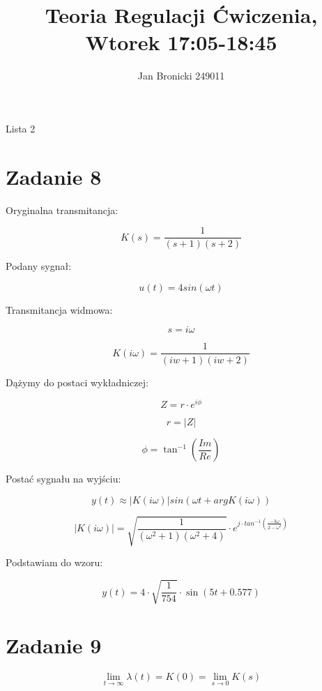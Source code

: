 \documentclass{article}
\title{Teoria Regulacji Ćwiczenia, Wtorek 17:05-18:45}
\author{Jan Bronicki 249011 }
\date{}
\begin{document}
\maketitle


\begin{center}
    Lista 2
\end{center}

\section*{Zadanie 8}

Oryginalna transmitancja:

$$ K(s) = \frac{1}{\left(s + 1\right) \left(s + 2\right)} $$

Podany sygnał:

$$ u(t) = 4sin(\omega t) $$

Transmitancja widmowa:

$$ s = i\omega $$

$$K(i\omega) = \frac{1}{\left(i w + 1\right) \left(i w + 2\right)}$$

Dążymy do postaci wykładniczej:

$$ Z=r\cdot e^{i\phi} $$

$$ r = |Z| $$

$$ \phi = \tan^{-1}\left(\frac{Im}{Re}\right) $$

Postać sygnału na wyjściu:

$$y(t)\approx\left|K(i\omega)\right|sin\left(\omega t + argK(i \omega)\right)$$



$$ \left|K(i\omega)\right| = \sqrt{\frac{1}{(\omega^{2}+1)(\omega^{2}+4)}}\cdot e^{j\cdot 
tan^{-1}\left(\frac{-3\omega}{2-\omega^{2}}\right)} $$

Podstawiam do wzoru:

$$y(t)=4\cdot \sqrt{\frac{1}{754}}\cdot \sin\left(5t+0.577\right)$$












\newpage

\section*{Zadanie 9}

$$ \lim\limits_{t \to \infty} \lambda(t) = K(0) = \lim\limits_{s \to 0} K(s)  $$
\end{document}

